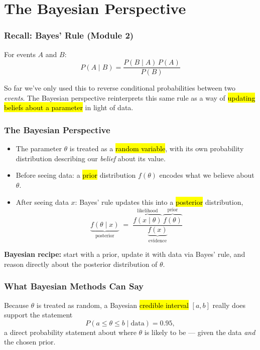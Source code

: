 \documentclass[slidestop,compress,mathserif]{beamer}
\begin{document}

\section{The Bayesian Perspective}

\begin{frame}
    \frametitle{Recall: Bayes' Rule (Module 2)}
    For events $A$ and $B$:
    \[
    P(A \mid B) = \frac{P(B \mid A)\, P(A)}{P(B)}
    \]
    \pause

    \medskip
    So far we've only used this to reverse conditional probabilities between two \emph{events}. The Bayesian perspective reinterprets this same rule as a way of \hl{updating beliefs about a parameter} in light of data.
\end{frame}

\begin{frame}
    \frametitle{The Bayesian Perspective}
    \begin{itemize}
        \item The parameter $\theta$ is treated as a \hl{random variable}, with its own probability distribution describing our \emph{belief} about its value.
        \pause
        \item Before seeing data: a \hl{prior} distribution $f(\theta)$ encodes what we believe about $\theta$.
        \pause
        \item After seeing data $x$: Bayes' rule updates this into a \hl{posterior} distribution,
        \[
        \underbrace{f(\theta \mid x)}_{\text{posterior}} \;=\; \frac{\overbrace{f(x \mid \theta)}^{\text{likelihood}}\, \overbrace{f(\theta)}^{\text{prior}}}{\underbrace{f(x)}_{\text{evidence}}}
        \]
    \end{itemize}
    \pause

    \medskip
    \textbf{Bayesian recipe:} start with a prior, update it with data via Bayes' rule, and reason directly about the posterior distribution of $\theta$.
\end{frame}

\begin{frame}
    \frametitle{What Bayesian Methods Can Say}
    Because $\theta$ is treated as random, a Bayesian \hl{credible interval} $[a,b]$ really does support the statement
    \[
    P(a \le \theta \le b \mid \text{data}) = 0.95,
    \]
    a direct probability statement about where $\theta$ is likely to be --- given the data \emph{and} the chosen prior.
    \pause
    
    \medskip
\end{frame}
\end{document}
